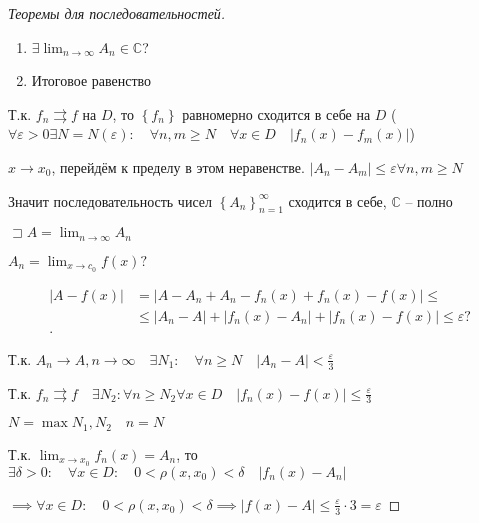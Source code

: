 \documentclass{book}
\renewcommand\C{\ensuremath{\mathbb{C}}}
\theoremstyle{definition}
\begin{document}
    \begin{proof}
        [Теоремы для последовательностей]

        \begin{enumerate}
            \item $\exists \lim_{n \to \infty} A_n\in \C$?
            \item Итоговое равенство
        \end{enumerate}

        Т.к. $f_n\rightrightarrows f$ на  $D$, то  $\left\{ f_n \right\} $ равномерно сходится в себе на $D$ ($\forall \varepsilon>0 \exists N = N(\varepsilon): \quad \forall n, m \geqslant N\quad \forall x\in D\quad \left| f_n(x) - f_m(x) \right| $) 

        $x \to x_0$, перейдём к пределу в этом неравенстве. $\left| A_n - A_m \right| \leqslant \varepsilon \forall n, m \geqslant N$

        Значит последовательность чисел $\left\{ A_n \right\} _{n=1}^{\infty }$ сходится в себе, $\C$ -- полно

        $\sqsupset A = \lim_{n \to \infty} A_n$

        $A_n = \lim_{x \to c_0} f(x)?$

        \begin{align*}
            \left| A - f(x) \right| &= \left| A - A_n + A_n - f_n(x) + f_n(x) - f(x) \right| \leqslant  \\
                                    &\leqslant \left| A_n - A \right|  + \left| f_n(x) - A_n \right|  + \left| f_n(x) - f(x) \right| \leqslant \varepsilon? \\
        .\end{align*}

        Т.к. $A_n \to A, n\to \infty \quad \exists N_1: \quad \forall n \geqslant N\quad  \left| A_n - A \right| <\frac{\varepsilon}{3}$ 

        Т.к. $f_n\rightrightarrows f\quad \exists N_2: \forall n \geqslant N_2 \forall x\in D\quad \left| f_n(x) - f(x) \right| \leqslant \frac{\varepsilon}{3}$ 

        $N = \max{N_1, N_2}\quad n = N$

        Т.к. $\lim_{x \to x_0} f_n(x) = A_n$, то $\exists \delta > 0:\quad \forall x\in D:\quad 0<\rho(x, x_0) <\delta\quad \left| f_n(x) - A_n \right| $

        $\implies \forall x\in D:\quad 0<\rho(x, x_0) < \delta \implies \left| f(x) - A \right| \leqslant \frac{\varepsilon}{3}\cdot 3 = \varepsilon$

    \end{proof}
\end{document}

